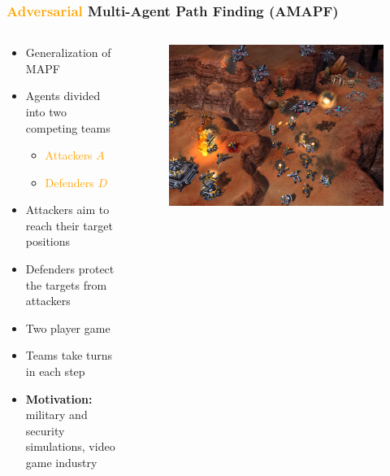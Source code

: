 \documentclass[aspectratio=169,t,xcolor=table]{beamer}
\begin{document}
\begin{frame}
\frametitle{\\\textcolor{orange}{Adversarial} Multi-Agent Path Finding (AMAPF)}
\begin{columns}
\begin{column}{.65\textwidth}
\begin{itemize}
    \item Generalization of MAPF
    \item Agents divided into two competing teams
    \begin{itemize}
        \item<2-> \textcolor{orange}{Attackers $A$} 
        \item<2-> \textcolor{orange}{Defenders $D$} 
    \end{itemize}
        \item<3-> Attackers aim to reach their target positions
        \item<3-> Defenders protect the targets from attackers
    \item<4-> Two player game
    \item<4-> Teams take turns in each step
    \item<5-> \textbf{Motivation: } military and security simulations, video game industry
\end{itemize}
\end{column}
\begin{column}{.35\textwidth}
        \begin{figure}
        \hspace{-60pt}
        \vspace{-40pt}
        \includegraphics[width=.8\textwidth]{figs/game.jpg}
    \end{figure}
\end{column}
\end{columns}
\end{frame}
\end{document}
